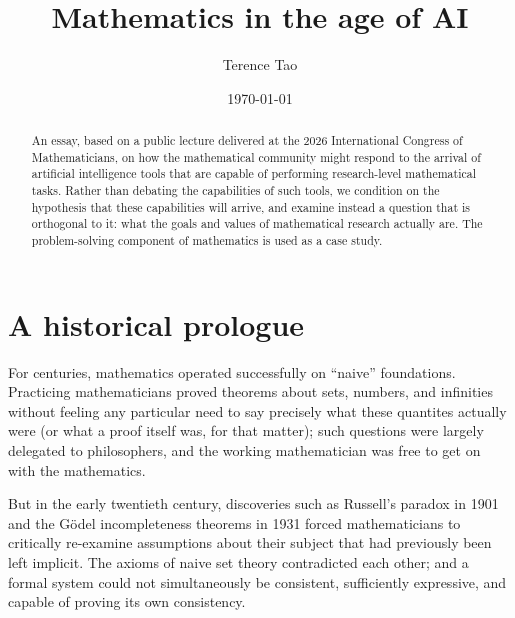 \documentclass[12pt]{amsart}
\theoremstyle{definition}
\begin{document}

\title{Mathematics in the age of AI}


\author{Terence Tao}
\address{UCLA Department of Mathematics, Los Angeles, CA 90095-1555.}




\date{\today}

\begin{abstract} An essay, based on a public lecture delivered at the 2026 International Congress of Mathematicians, on how the mathematical community might respond to the arrival of artificial intelligence tools that are capable of performing research-level mathematical tasks.  Rather than debating the capabilities of such tools, we condition on the hypothesis that these capabilities will arrive, and examine instead a question that is orthogonal to it: what the goals and values of mathematical research actually are.  The problem-solving component of mathematics is used as a case study.
\end{abstract}

\maketitle

\section{A historical prologue}

For centuries, mathematics operated successfully on ``naive'' foundations.  Practicing mathematicians proved theorems about sets, numbers, and infinities without feeling any particular need to say precisely what these quantites actually were (or what a proof itself was, for that matter); such questions were largely delegated to philosophers, and the working mathematician was free to get on with the mathematics.  

But in the early twentieth century, discoveries such as Russell's paradox in 1901 \cite{russell} and the G\"odel incompleteness theorems in 1931 \cite{godel} forced mathematicians to critically re-examine assumptions about their subject that had previously been left implicit.  The axioms of naive set theory contradicted each other; and a formal system could not simultaneously be consistent, sufficiently expressive, and capable of proving its own consistency.
\end{document}
